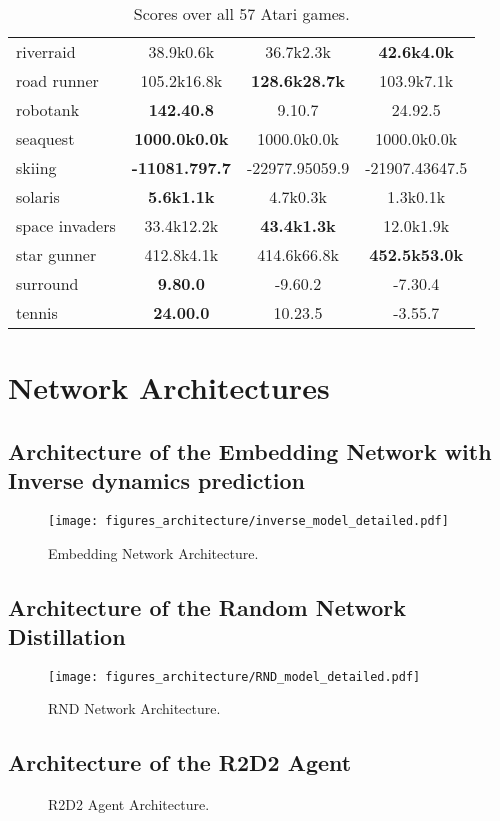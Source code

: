 \documentclass{article} \usepackage{iclr2020_conference,times}
\begin{document}
\begin{table}[ht!]
\begin{tabular}{l|c|c|c}
riverraid  & 38.9k0.6k & 36.7k2.3k & \textbf{42.6k4.0k} \\
road runner  & 105.2k16.8k & \textbf{128.6k28.7k} & 103.9k7.1k \\
robotank  & \textbf{142.40.8} & 9.10.7 & 24.92.5 \\
seaquest  & \textbf{1000.0k0.0k} & 1000.0k0.0k & 1000.0k0.0k \\
skiing  & \textbf{-11081.797.7} & -22977.95059.9 & -21907.43647.5 \\
solaris  & \textbf{5.6k1.1k} & 4.7k0.3k & 1.3k0.1k \\
space invaders  & 33.4k12.2k & \textbf{43.4k1.3k} & 12.0k1.9k \\
star gunner  & 412.8k4.1k & 414.6k66.8k & \textbf{452.5k53.0k} \\
surround  & \textbf{9.80.0} & -9.60.2 & -7.30.4 \\
tennis  & \textbf{24.00.0} & 10.23.5 & -3.55.7
\end{tabular}
\caption{Scores over all 57 Atari games.}
\label{table_atari57}
\end{table}


\clearpage
\newpage
\section{Network Architectures}
\subsection{Architecture of the Embedding Network with Inverse dynamics prediction}
\label{embedding_network}
\begin{figure}[!h]
    \centering
    \texttt{[image: figures\_architecture/inverse\_model\_detailed.pdf]}
    \caption{Embedding Network Architecture.} 
    \label{Embedding Network.}
\end{figure}


\subsection{Architecture of the Random Network Distillation}
\label{rnd_network}
\begin{figure}[!h]
    \centering
    \texttt{[image: figures\_architecture/RND\_model\_detailed.pdf]}
    \caption{RND Network Architecture.} 
    \label{RND Network.}
\end{figure}

\subsection{Architecture of the R2D2 Agent}
\label{r2d2_network}
\begin{figure}[!h]
    \centering
    \hspace{4ex}
    \caption{R2D2 Agent Architecture.} 
    \label{R2D2 Network.}
\end{figure}
\end{document}
